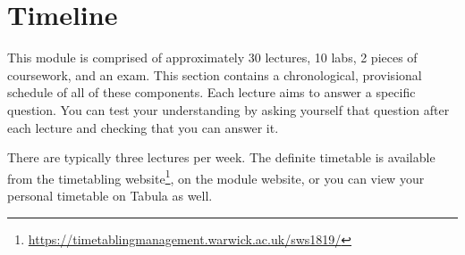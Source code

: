 \section{Timeline}

This module is comprised of approximately 30 lectures, 10 labs, 2 pieces of coursework, and an exam. This section contains a chronological, provisional schedule of all of these components. Each lecture aims to answer a specific question. You can test your understanding by asking yourself that question after each lecture and checking that you can answer it. 

There are typically three lectures per week. The definite timetable is available from the timetabling website\footnote{\url{https://timetablingmanagement.warwick.ac.uk/sws1819/}}, on the module website, or you can view your personal timetable on Tabula as well. 

\newcommand{\foo}{\makebox[0pt]{\textbullet}\hskip-0.5pt\vrule width 1pt\hspace{\labelsep}}

\newcommand{\LectureEntry}[4]{#1 & \begin{tabular}{p{11cm}}
		\textbf{#2} \\
		\emph{#3} \\
		#4
\end{tabular}}
\newcommand{\LabEntry}[3]{#1 & \begin{tabular}{p{11cm}}
		\textbf{#2} \\
		#3
\end{tabular}}

